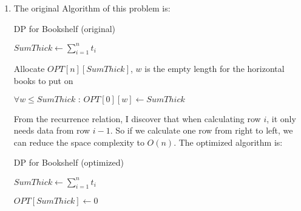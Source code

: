 \documentclass[12pt,a4paper]{article}
\makeatletter
\newtheorem*{solution}{Solution}
\theoremstyle{definition}
\renewenvironment{solution}[1][Solution] {\par\pushQED{\qed}\normalfont\topsep6\p@\@plus6\p@\relax\trivlist\item[\hskip\labelsep\bfseries#1\@addpunct{.}]\ignorespaces}{\popQED\endtrivlist\@endpefalse} \makeatother
\makeatother
\begin{document}
\begin{enumerate}
\begin{solution}
        The original Algorithm of this problem is:\\
        \begin{minipage}[t]{0.89\textwidth}
        	\begin{algorithm}[H]
        		\BlankLine
        		\caption{DP for Bookshelf (original)}
        		\label{Alg-1}
        		
        		$ SumThick \leftarrow \sum_{i = 1}^{n}t_i$\;
        		
        		Allocate $ OPT[n][SumThick] $, $ w $ is the empty length for the horizontal books to put on\;
        		
        		$ \forall w\le SumThick\text{ : }OPT[0][w]\leftarrow SumThick $\;
        		
        		
        		\;
        		
        	\end{algorithm}
        \end{minipage}
    
        From the recurrence relation, I discover that when calculating row $ i $, it only needs data from row $ i - 1 $. So if we calculate one row from right to left, we can reduce the space complexity to $ O(n) $. The optimized algorithm is:\\
        \begin{minipage}[t]{0.89\textwidth}
        	\begin{algorithm}[H]
        		\BlankLine
        		\caption{DP for Bookshelf (optimized)}
        		\label{Alg-2}
        		
        		$ SumThick \leftarrow \sum_{i = 1}^{n}t_i$\;
        		
        		$ OPT[SumThick]\leftarrow 0 $\;
        		
        		

\end{algorithm}
\end{minipage}
\end{solution}
\end{enumerate}
\end{document}
